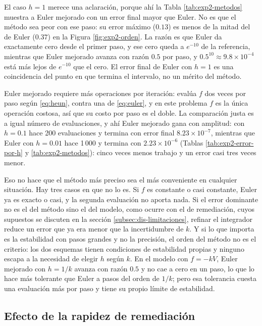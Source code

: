 El caso $h = 1$ merece una aclaración, porque ahí la Tabla \ref{tab:exp2-metodos} muestra a
Euler mejorado con un error final mayor que Euler. No es que el método sea peor con ese paso:
su error máximo ($0.13$) es menos de la mitad del de Euler ($0.37$) en la Figura
\ref{fig:exp2-orden}. La razón es que Euler da exactamente cero desde el primer paso, y ese
cero queda a $e^{-10}$ de la referencia, mientras que Euler mejorado avanza con razón $0.5$ por
paso, y $0.5^{10} \approx 9.8 \times 10^{-4}$ está más lejos de $e^{-10}$ que el cero. El error
final de Euler con $h = 1$ es una coincidencia del punto en que termina el intervalo, no un
mérito del método.

Euler mejorado requiere más operaciones por iteración: evalúa $f$ dos veces por paso según
\eqref{eq:heun}, contra una de \eqref{eq:euler}, y en este problema $f$ es la única operación
costosa, así que su costo por paso es el doble. La comparación justa es a igual número de
evaluaciones, y ahí Euler mejorado gana con amplitud: con $h = 0.1$ hace 200 evaluaciones y
termina con error final $8.23 \times 10^{-7}$, mientras que Euler con $h = 0.01$ hace 1\,000 y
termina con $2.23 \times 10^{-6}$ (Tablas \ref{tab:exp2-error-por-h} y \ref{tab:exp2-metodos}):
cinco veces menos trabajo y un error casi tres veces menor.

Eso no hace que el método más preciso sea el más conveniente en cualquier situación. Hay tres
casos en que no lo es. Si $f$ es constante o casi constante, Euler ya es exacto o casi, y la
segunda evaluación no aporta nada. Si el error dominante no es el del método sino el del modelo,
como ocurre con el de remediación, cuyos supuestos se discuten en la sección
\ref{subsec:dis-limitaciones}, refinar el integrador reduce un error que ya era menor que la
incertidumbre de $k$. Y si lo que importa es la estabilidad con pasos grandes y no la precisión,
el orden del método no es el criterio: los dos esquemas tienen condiciones de estabilidad
propias y ninguno escapa a la necesidad de elegir $h$ según $k$. En el modelo con $f = -kV$,
Euler mejorado con $h = 1/k$ avanza con razón $0.5$ y no cae a cero en un paso, lo que lo hace
más tolerante que Euler a pasos del orden de $1/k$; pero esa tolerancia cuesta una evaluación
más por paso y tiene su propio límite de estabilidad.

\subsection{Efecto de la rapidez de remediación}
\label{subsec:dis-organizaciones}

